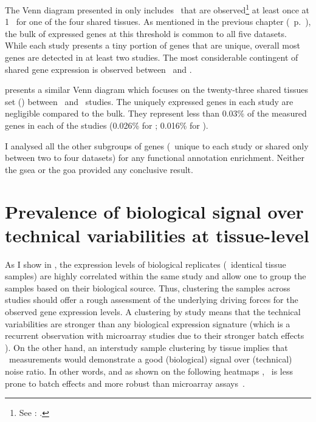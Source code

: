The Venn diagram presented in  only includes \pcgs\
that are observed\footnote{See
: .}
at least once at 1 \FPKM\ for one of the four shared tissues.
As mentioned in the previous chapter (~p.~\pageref{def:trep}),
the bulk of expressed genes at this threshold is common
to all five datasets.
While each study presents a tiny portion of genes
that are unique,
overall most genes are detected in at least two studies.
The most considerable contingent of shared gene expression is observed
between \uhlen\ and \gtex.

 presents a similar Venn diagram
which focuses on the twenty-three shared tissues set (\setTwo)
between \uhlen\ and \gtex\ studies.
The uniquely expressed genes in each study are negligible compared to the bulk.
They represent less than 0.03\% of the measured genes in each of the studies
(0.026\% for \uhlen; 0.016\% for \gtex).
\begin{comment}
    Gtex:   462/17551 hence 0.02632329\%
    Uhlen:  281/17551 hence 0.01601048\%
\end{comment}

I analysed all the other subgroups of genes
(\ie\ unique to each study or shared only between two to four datasets)
for any functional annotation enrichment.
Neither the \gls{gsea} or the \gls{goa}
provided any conclusive result.

\section{Prevalence of biological signal over technical variabilities at
tissue-level}\label{sec:Trans_ReproExpresTissue}

As I show in ,
the expression levels of biological replicates (\ie\ identical tissue samples)
are highly correlated within the same study
and allow one to group the samples based on their biological source.
Thus, clustering the samples across studies should offer a rough assessment of
the underlying driving forces for the observed gene expression levels.
A clustering by study means that the technical variabilities are stronger
than any biological expression signature
(which is a recurrent observation with microarray studies
due to their stronger batch effects ).
On the other hand,
an interstudy sample clustering by tissue implies that \Rnaseq\ measurements
would demonstrate a good (biological) signal over (technical) noise ratio.
In other words,
and as shown on the following heatmaps ,
\Rnaseq\ is less prone to batch effects and more robust than
microarray assays~.

